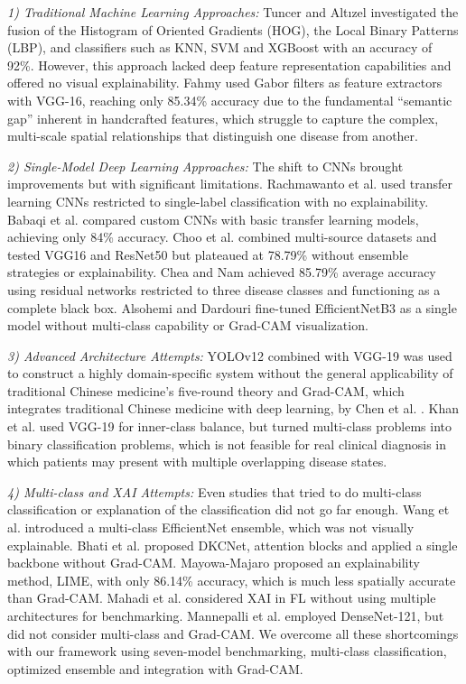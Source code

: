 \documentclass[conference]{IEEEtran}
\begin{document}
{\textit{1) Traditional Machine Learning Approaches:} Tuncer and Alt{\i}zel \cite{paper12} investigated the fusion of the Histogram of Oriented Gradients (HOG), the Local Binary Patterns (LBP), and classifiers such as KNN, SVM and XGBoost with an accuracy of 92\%. However, this approach lacked deep feature representation capabilities and offered no visual explainability. Fahmy \cite{paper10} used Gabor filters as feature extractors with VGG-16, reaching only 85.34\% accuracy due to the fundamental ``semantic gap'' inherent in handcrafted features, which struggle to capture the complex, multi-scale spatial relationships that distinguish one disease from another.

{\textit{2) Single-Model Deep Learning Approaches:}  The shift to CNNs brought improvements but with significant limitations. Rachmawanto et al. \cite{paper7} used transfer learning CNNs restricted to single-label classification with no explainability. Babaqi et al. \cite{paper16} compared custom CNNs with basic transfer learning models, achieving only 84\% accuracy. Choo et al. \cite{paper17} combined multi-source datasets and tested VGG16 and ResNet50 but plateaued at 78.79\% without ensemble strategies or explainability. Chea and Nam \cite{paper13} achieved 85.79\% average accuracy using residual networks restricted to three disease classes and functioning as a complete black box. Alsohemi and Dardouri \cite{paper18} fine-tuned EfficientNetB3 as a single model without multi-class capability or Grad-CAM visualization.

\textit{3) Advanced Architecture Attempts:} YOLOv12 combined with VGG-19 was used to construct a highly domain-specific system without the general applicability of traditional Chinese medicine's five-round theory and Grad-CAM, which integrates traditional Chinese medicine with deep learning, by Chen et al. \cite{paper14}. Khan et al. \cite{paper9} used VGG-19 for inner-class balance, but turned multi-class problems into binary classification problems, which is not feasible for real clinical diagnosis in which patients may present with multiple overlapping disease states.

\textit{4) Multi-class and XAI Attempts:} Even studies that tried to do multi-class classification or explanation of the classification did not go far enough. Wang et al. \cite{paper4} introduced a multi-class EfficientNet ensemble, which was not visually explainable. Bhati et al. \cite{paper6} proposed DKCNet, attention blocks and applied a single backbone without Grad-CAM. Mayowa-Majaro \cite{paper5} proposed an explainability method, LIME, with only 86.14\% accuracy, which is much less spatially accurate than Grad-CAM. Mahadi et al. \cite{paper1} considered XAI in FL without using multiple architectures for benchmarking. Mannepalli et al. \cite{paper24} employed DenseNet-121, but did not consider multi-class and Grad-CAM. We overcome all these shortcomings with our framework using seven-model benchmarking, multi-class classification, optimized ensemble and integration with Grad-CAM.

}}
\end{document}
